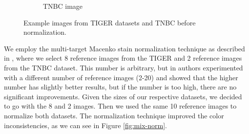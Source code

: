 \begin{figure}[H]
\begin{subfigure}[b]{0.32\textwidth}
    \caption{TNBC image}
    \label{fig:tnbc}
  \end{subfigure}

  \caption{Example images from TIGER datasets \cite{tiger_dataset} and TNBC \cite{TNBC-nuclei-seg-extended} before normalization.}
  \label{fig:mix-no-norm}
\end{figure}

We employ the multi-target Macenko stain normalization technique as described in \cite{Ivanov2024}, where we select 8 reference images from the TIGER and 2 reference images from the TNBC dataset. This number is arbitrary, but in \cite{Ivanov2024} authors experimented with a different number of reference images (2-20) and showed that the higher number has slightly better results, but if the number is too high, there are no significant improvements. Given the sizes of our respective datasets, we decided to go with the 8 and 2 images. Then we used the same 10 reference images to normalize both datasets. The normalization technique improved the color inconsistencies, as we can see in Figure \ref{fig:mix-norm}.

